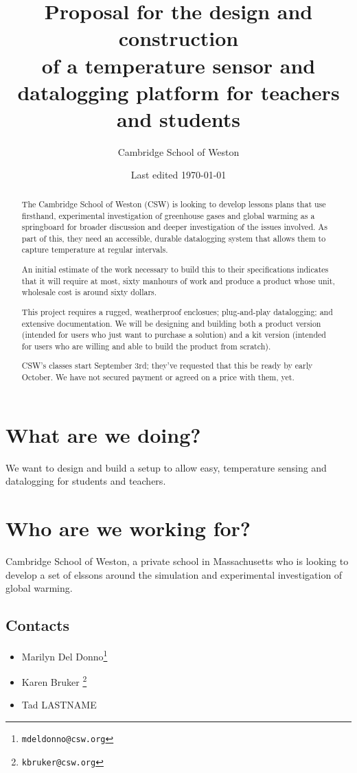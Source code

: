 \documentclass[11pt]{article}
\title{Proposal for the design and construction \\ of a temperature sensor and datalogging platform for teachers and students}
\author{Cambridge School of Weston}
\date{Last edited \today}
\begin{document}
\maketitle
\begin{abstract}
The Cambridge School of Weston (CSW) is looking to develop lessons plans that use firsthand, experimental investigation of greenhouse gases and global warming as a springboard for broader discussion and deeper investigation of the issues involved.  As part of this, they need an accessible, durable datalogging system that allows them to capture temperature at regular intervals.

An initial estimate of the work necessary to build this to their specifications indicates that it will require at most, sixty manhours of work and produce a product whose unit, wholesale cost is around sixty dollars.

This project requires a rugged, weatherproof enclosues; plug-and-play datalogging; and extensive documentation.  We will be designing and building both a product version (intended for users who just want to purchase a solution) and a kit version (intended for users who are willing and able to build the product from scratch).

CSW's classes start September 3rd; they've requested that this be ready by early October.  We have not secured payment or agreed on a price with them, yet.  
\end{abstract}

\newpage

\section{What are we doing?}
We want to design and build a setup to allow easy, temperature sensing and datalogging for students and teachers.


\section{Who are we working for?}
Cambridge School of Weston, a private school in Massachusetts who is looking to develop a set of elssons around the simulation and experimental investigation of global warming.
\subsection{Contacts}
\begin{itemize}
\item Marilyn Del Donno\footnote{\texttt{mdeldonno@csw.org}}
\item Karen Bruker \footnote{\texttt{kbruker@csw.org}}
\item Tad LASTNAME
\end{itemize}
\end{document}
